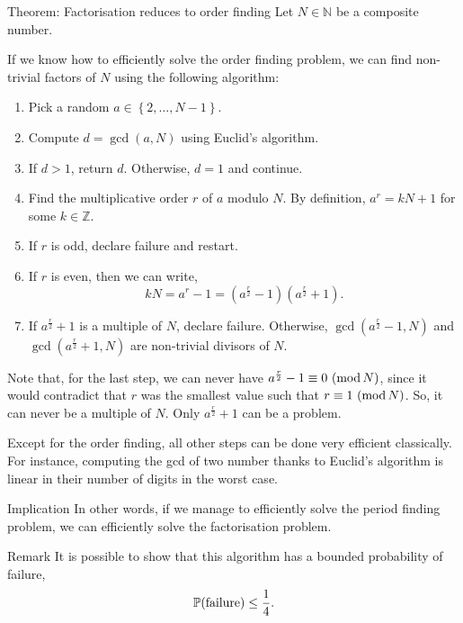 \documentclass[a4paper]{article}
\begin{document}
\begin{parag}{Theorem: Factorisation reduces to order finding}
    Let $N \in \mathbb{N}$ be a composite number. 

    If we know how to efficiently solve the order finding problem, we can find non-trivial factors of $N$ using the following algorithm:
    \begin{enumerate}
        \item Pick a random $a \in \left\{2, \ldots, N-1\right\}$.
        \item Compute $d = \gcd\left(a, N\right)$ using Euclid's algorithm.
        \item If $d > 1$, return $d$. Otherwise, $d = 1$ and continue.
        \item Find the multiplicative order $r$ of $a$ modulo $N$. By definition, $a^r = kN + 1$ for some $k \in \mathbb{Z}$.
        \item If $r$ is odd, declare failure and restart.
        \item If $r$ is even, then we can write, 
        \[kN = a^r - 1 = \left(a^{\frac{r}{2}} - 1\right) \left(a^{\frac{r}{2}} + 1\right).\]
        \item If $a^{\frac{r}{2}} + 1$ is a multiple of $N$, declare failure. Otherwise, $\gcd\left(a^{\frac{r}{2}} - 1, N\right)$ and $\gcd\left(a^{\frac{r}{2}} + 1, N\right)$ are non-trivial divisors of $N$.
    \end{enumerate}

    Note that, for the last step, we can never have $a^{\frac{r}{2}} - 1 \equiv 0\ (\operatorname{mod} N)$, since it would contradict that $r$ was the smallest value such that $r \equiv 1\ (\operatorname{mod} N)$. So, it can never be a multiple of $N$. Only $a^{\frac{r}{2}} + 1$ can be a problem.

    Except for the order finding, all other steps can be done very efficient classically. For instance, computing the gcd of two number thanks to Euclid's algorithm is linear in their number of digits in the worst case.

    \begin{subparag}{Implication}
        In other words, if we manage to efficiently solve the period finding problem, we can efficiently solve the factorisation problem.
    \end{subparag}

    \begin{subparag}{Remark}
        It is possible to show that this algorithm has a bounded probability of failure,
        \[\prob\left(\text{failure}\right) \leq \frac{1}{4}.\]
    \end{subparag}
\end{parag}
\end{document}
